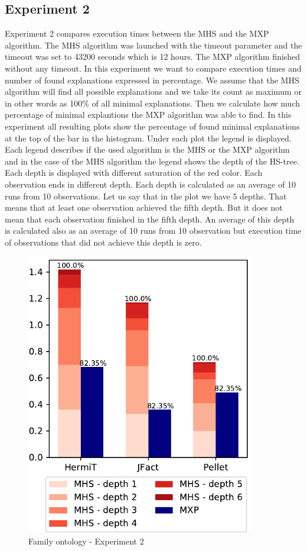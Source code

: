 \documentclass[12pt,a4paper]{article}
\begin{document}
\subsection{Experiment 2}
Experiment 2 compares execution times between the MHS and the MXP algorithm. The MHS algorithm was launched with the timeout parameter and the timeout was set to 43200 seconds which is 12 hours. The MXP algorithm finished without any timeout. In this experiment we want to compare execution times and number of found explanations expressed in percentage. We assume that the MHS algorithm will find all possible explanations and we take its count as maximum or in other words as 100\% of all minimal explanations. Then we calculate how much percentage of minimal explantions the MXP algorithm was able to find. In this experiment all resulting plots show the percentage of found minimal explanations at the top of the bar in the histogram. Under each plot the legend is displayed. Each legend describes if the used algorithm is the MHS or the MXP algorithm and in the case of the MHS algorithm the legend shows the depth of the HS-tree. Each depth is displayed with different saturation of the red color. Each observation ends in different depth. Each depth is calculated as an average of 10 runs from 10 observations. Let us say that in the plot we have 5 depths. That means that at least one observation achieved the fifth depth. But it does not mean that each observation finished in the fifth depth. An average of this depth is calculated also as an average of 10 runs from 10 observation but execution time of observations that did not achieve this depth is zero.

\begin{figure}[H]
	\centering
	\includegraphics[width=10cm]{eval2Family} 	
	\caption{Family ontology - Experiment 2}
	\label{fig:eval2Family}
\end{figure}
\end{document}
